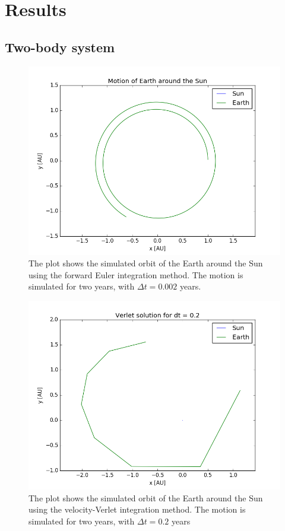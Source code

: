 \section{Results}\label{sec:res}
\subsection{Two-body system}
\begin{figure}[H]
\includegraphics[scale=0.7]{figures/earth_sun_euler}
\caption{The plot shows the simulated orbit of the Earth around the Sun using the forward Euler integration method. The motion is simulated for two years, with $\Delta t = 0.002$ years.}
\end{figure}


\begin{figure}[H]
\includegraphics[scale=0.7]{figures/verlet_02}
\caption{The plot shows the simulated orbit of the Earth around the Sun using the velocity-Verlet integration method. The motion is simulated for two years, with $\Delta t = 0.2$ years}
\end{figure}

